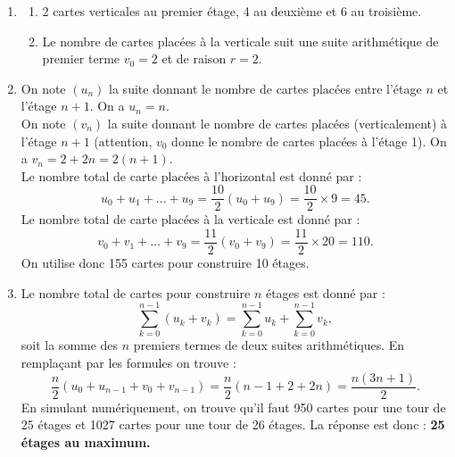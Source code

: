 {\begin{enumerate}
\begin{enumerate}
	\item Le nombre de cartes placées à l'horizontal suit une suite arithmétique de premier terme $u_0 = 0$ et de raison $r=1$.
	\end{enumerate}
\item
	\begin{enumerate}
	\item 2 cartes verticales au premier étage, 4 au deuxième et 6 au troisième.
	\item Le nombre de cartes placées à la verticale suit une suite arithmétique de premier terme $v_0 = 2$ et de raison $r=2$.
	\end{enumerate}
\item On note $(u_n)$ la suite donnant le nombre de cartes placées entre l'étage $n$ et l'étage $n+1$. On a $u_n = n$. \\
On note $(v_n)$ la suite donnant le nombre de cartes placées (verticalement) à l'étage $n+1$ (attention, $v_0$ donne le nombre de cartes placées à l'étage 1). On a $v_n = 2 + 2n = 2(n+1)$. \\

Le nombre total de carte placées à l'horizontal est donné par :
\[ u_0 + u_1 + \dots + u_9 = \dfrac{10}2 (u_0 + u_9) = \dfrac{10}2 \times 9 = 45. \] 
Le nombre total de carte placées à la verticale est donné par :
\[ v_0 + v_1 + \dots + v_9 = \dfrac{11}2 (v_0 + v_9) = \dfrac{11}2 \times 20 = 110. \]
On utilise donc 155 cartes pour construire 10 étages. 
\item Le nombre total de cartes pour construire $n$ étages est donné par :
\[ \sum_{k=0}^{n-1} (u_k + v_k) = \sum_{k=0}^{n-1} u_k + \sum_{k=0}^{n-1} v_k, \]
soit la somme des $n$ premiers termes de deux suites arithmétiques. En remplaçant par les formules on trouve :
\[ \dfrac{n}2 (u_0 + u_{n-1} + v_0 + v_{n-1}) = \dfrac{n}2 (n-1 + 2 + 2n) = \dfrac{n(3n+1)}2 . \]
En simulant numériquement, on trouve qu'il faut 950 cartes pour une tour de 25 étages et 1027 cartes pour une tour de 26 étages. 
La réponse est donc : \textbf{25 étages au maximum.}
\end{enumerate}
}

